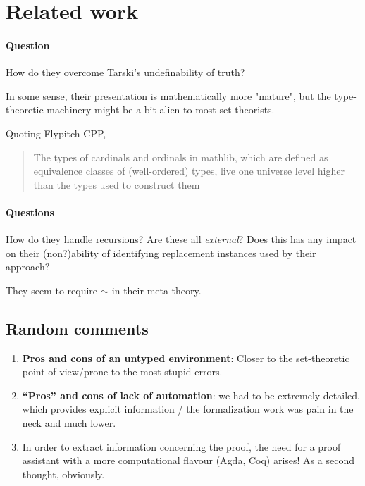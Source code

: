 \section{Related work}
\label{sec:related-work}

\paragraph*{Question} How do they overcome Tarski's undefinability of truth?

In some sense, their presentation is mathematically more "mature",
but the type-theoretic machinery might be a bit alien to most
set-theorists.

Quoting Flypitch-CPP,
\begin{quote}
  The types of cardinals and ordinals in mathlib, which
  are defined as equivalence classes of (well-ordered) types, live one
  universe level higher than the types used to construct them
\end{quote}

\paragraph*{Questions} How do they handle recursions? Are these all
\emph{external}? Does this has any impact on their (non?)ability of
identifying replacement instances used by their approach?

They seem to require $\AC$ in their meta-theory.

\subsection{Random comments}

\begin{enumerate}
\item  \textbf{Pros and cons of an untyped environment}: Closer to the
  set-theoretic point of view/prone to the most stupid errors.
\item \textbf{“Pros” and cons of lack of automation}: we had to be extremely
  detailed, which provides explicit information / the formalization
  work was pain in the neck and much lower.
\item In order to extract information concerning the proof, the need for a
  proof assistant with a more computational flavour (Agda, Coq)
  arises! As a second thought, obviously.
\end{enumerate}

